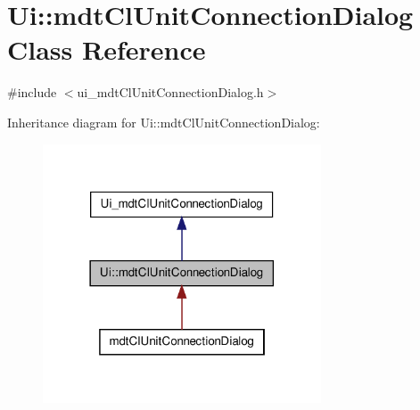 \hypertarget{class_ui_1_1mdt_cl_unit_connection_dialog}{\section{Ui\-:\-:mdt\-Cl\-Unit\-Connection\-Dialog Class Reference}
\label{class_ui_1_1mdt_cl_unit_connection_dialog}
}


{\ttfamily \#include $<$ui\-\_\-mdt\-Cl\-Unit\-Connection\-Dialog.\-h$>$}



Inheritance diagram for Ui\-:\-:mdt\-Cl\-Unit\-Connection\-Dialog\-:\nopagebreak
\begin{figure}[H]
\begin{center}
\leavevmode
\includegraphics[width=234pt]{class_ui_1_1mdt_cl_unit_connection_dialog__inherit__graph}
\end{center}
\end{figure}


